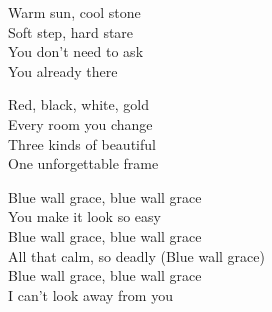 \begin{lyrics}
Warm sun, cool stone\\
Soft step, hard stare\\
You don’t need to ask\\
You already there

Red, black, white, gold\\
Every room you change\\
Three kinds of beautiful\\
One unforgettable frame

Blue wall grace, blue wall grace\\
You make it look so easy\\
Blue wall grace, blue wall grace\\
All that calm, so deadly
(Blue wall grace)\\
Blue wall grace, blue wall grace\\
I can’t look away from you
\end{lyrics}

